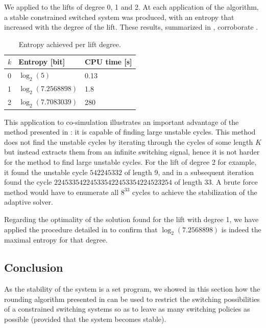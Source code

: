 \documentclass[11pt,twoside,a4paper,openright]{uclouvain-thesis}
\begin{document}
We applied  to the lifts of degree 0, 1 and 2. %
At each application of the algorithm, a stable constrained switched system was produced, with an entropy that increased with the degree of the lift.
These results, summarized in , corroborate .

\begin{table}[tbh]
  \centering
  \caption{Entropy achieved per lift degree.}
  \label{tab:entropy_over_k}
  \begin{tabular}{l|l|l}
    $k$ & Entropy [bit] & CPU time [s]\\
    \hline
    0 & $\log_2(5)$ & 0.13\\
    1 & $\log_2(7.2568898)$ & 1.8\\
    2 & $\log_2(7.7083039)$ & 280
  \end{tabular}
\end{table}

This application to co-simulation illustrates an important advantage of the method presented in : it is capable of finding large unstable cycles.
This method does not find the unstable cycles by iterating through the cycles of some length $K$ but instead extracts them from an infinite switching signal,
hence it is not harder for the method to find large unstable cycles.
For the lift of degree 2 for example, it found the unstable cycle $542245332$ of length 9, and in a subsequent iteration found the cycle $224533542245335422453354224523254$ of length 33.
A brute force method would have to enumerate all $8^{33}$ cycles to achieve the stabilization of the adaptive solver.

Regarding the optimality of the solution found for the lift with degree 1, we have applied the procedure detailed in  to confirm that $\log_2(7.2568898)$ is indeed the maximal entropy for that degree.



\subsection{Conclusion}
\label{sec:conclusion}

As the stability of the system is a set program, we showed in this section how
the rounding algorithm presented in 
can be used to restrict the switching possibilities
of a constrained switching systems so as to leave as many
switching policies as possible (provided that the system becomes stable).
\end{document}
